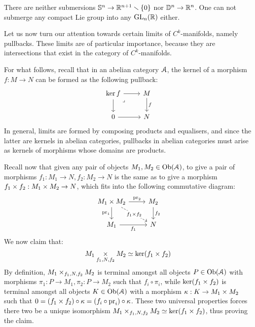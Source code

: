         \begin{example}
            There are neither submersions $\mathbb{S}^n \to \mathbb{R}^{n + 1} \smallsetminus \{0\}$ nor $\mathbb{D}^n \to \mathbb{R}^n$. One can not submerge any compact Lie group into any $\mathrm{GL}_n(\mathbb{R})$ either.
        \end{example}

        Let us now turn our attention towards certain limits of $C^k$-manifolds, namely pullbacks. These limits are of particular importance, because they are intersections that exist in the category of $C^k$-manifolds.
        \begin{remark} \label{remark: pullbacks_in_abelian_categories}
            For what follows, recall that in an abelian category $\mathcal{A}$, the kernel of a morphism $f: M \to N$ can be formed as the following pullback:
                $$
                    \begin{tikzcd}
                	{\ker f} & M \\
                	0 & N
                	\arrow[from=1-1, to=1-2]
                	\arrow[from=1-1, to=2-1]
                	\arrow["\lrcorner"{anchor=center, pos=0.125}, draw=none, from=1-1, to=2-2]
                	\arrow["f", from=1-2, to=2-2]
                	\arrow[from=2-1, to=2-2]
                    \end{tikzcd}
                $$
            In general, limits are formed by composing products and equalisers, and since the latter are kernels in abelian categories, pullbacks in abelian categories must arise as kernels of morphisms whose domains are products. 
            
            Recall now that given any pair of objects $M_1, M_2 \in \mathrm{Ob}(\mathcal{A})$, to give a pair of morphisms $f_1: M_1 \to N, f_2: M_2 \to N$ is the same as to give a morphism $f_1 \x f_2: M_1 \x M_2 \to N$, which fits into the following commutative diagram:
                $$
                    \begin{tikzcd}
                	{M_1 \x M_2} & {M_2} \\
                	{M_1} & N
                	\arrow["{\pr_2}", from=1-1, to=1-2]
                	\arrow["{\pr_1}"', from=1-1, to=2-1]
                	\arrow["{f_1 \x f_2}"{description}, dashed, from=1-1, to=2-2]
                	\arrow["{f_2}", from=1-2, to=2-2]
                	\arrow["{f_1}"', from=2-1, to=2-2]
                    \end{tikzcd}
                $$
            We now claim that:
                $$M_1 \x_{f_1, N, f_2} M_2 \cong \ker(f_1 \x f_2)$$
            By definition, $M_1 \x_{f_1, N, f_2} M_2$ is terminal amongst all objects $P \in \mathrm{Ob}(\mathcal{A})$ with morphisms $\pi_1: P \to M_1, \pi_2: P \to M_2$ such that $f_i \circ \pi_i$, while $\ker(f_1 \x f_2)$ is terminal amongst all objects $K \in \mathrm{Ob}(\mathcal{A})$ with a morphism $\kappa: K \to M_1 \x M_2$ such that $0 = (f_1 \x f_2) \circ \kappa = (f_i \circ \pr_i) \circ \kappa$. These two universal properties forces there two be a unique isomorphism $M_1 \x_{f_1, N, f_2} M_2 \cong \ker(f_1 \x f_2)$, thus proving the claim.


\end{remark}
